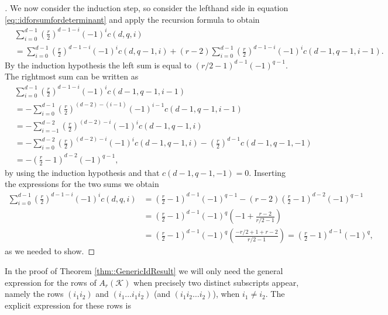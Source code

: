 \documentclass{biometrika}
\begin{document}
\begin{proof}[]

We now consider the induction step, so consider the lefthand side in equation \eqref{eq::idforsumfordeterminant} and apply the recursion formula to obtain
\begin{align*}
    &\sum_{i = 0}^{d-1} \left(\frac{r}{2} \right)^{d-1-i} (-1)^{i} c(d,q,i) \\ &= 
    \sum_{i = 0}^{d-1} \left(\frac{r}{2} \right)^{d-1-i} (-1)^{i} c(d,q-1,i) +
    (r-2)\sum_{i = 0}^{d-1} \left(\frac{r}{2} \right)^{d-1-i} (-1)^{i} c(d-1,q-1,i-1).  
\end{align*}
By the induction hypothesis the left sum is equal to $\left( r/2 - 1 \right)^{d-1} (-1)^{q-1}$. The rightmost sum can be written as
\begin{align*}
    &\sum_{i = 0}^{d-1} \left(\frac{r}{2} \right)^{d-1-i} (-1)^{i} c(d-1,q-1,i-1) \\ &= - \sum_{i = 0}^{d-1} \left(\frac{r}{2} \right)^{(d-2)-(i-1)} (-1)^{i-1} c(d-1,q-1,i-1) \\
    &= - \sum_{i = -1}^{d-2} \left(\frac{r}{2} \right)^{(d-2)-i} (-1)^{i} c(d-1,q-1,i) \\
    &= - \sum_{i = 0}^{d-2} \left(\frac{r}{2} \right)^{(d-2)-i} (-1)^{i} c(d-1,q-1,i) 
    - \left(\frac{r}{2} \right)^{d-1} c(d-1, q-1, -1) \\
    &= - \left(\frac{r}{2} -1 \right)^{d-2} (-1)^{q-1},
\end{align*}
by using the induction hypothesis and that $c(d-1, q-1, -1) = 0$. Inserting the expressions for the two sums we obtain
\begin{align*}
    \sum_{i = 0}^{d-1} \left(\frac{r}{2} \right)^{d-1-i} (-1)^{i} c(d,q,i) &= \left(\frac{r}{2} -1 \right)^{d-1} (-1)^{q-1} - (r-2)\left(\frac{r}{2} -1 \right)^{d-2} (-1)^{q-1} \\
    &=  \left(\frac{r}{2} -1 \right)^{d-1} (-1)^{q} \left( -1 + \frac{r-2}{r/2-1} \right) \\
    &=  \left(\frac{r}{2} -1 \right)^{d-1} (-1)^{q} \left(\frac{-r/2 + 1 + r-2}{r/2-1} \right) = 
    \left(\frac{r}{2} -1 \right)^{d-1} (-1)^{q},
\end{align*}
as we needed to show. 
\end{proof}

In the proof of Theorem \ref{thm::GenericIdResult} we will only need the general expression for the rows of $A_r(\mathcal{K} )$ when precisely two distinct subscripts appear, namely the rows $(i_1 i_2)$ and $(i_1 \dots  i_1 i_2)$ (and $(i_1  i_2 \dots i_2)$),  when $i_1 \neq i_2$. The explicit expression for these rows is
\end{document}
